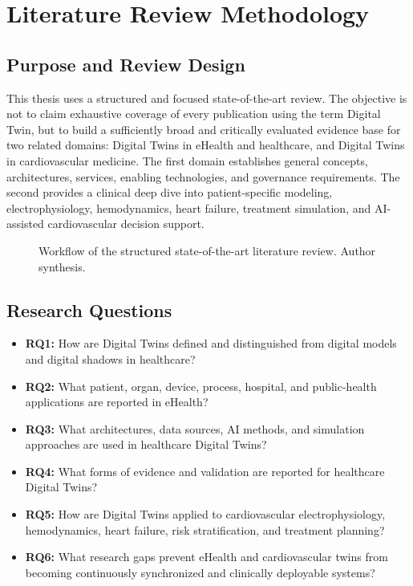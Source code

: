 \chapter{Literature Review Methodology}

\section{Purpose and Review Design}
This thesis uses a structured and focused state-of-the-art review. The objective is not to claim exhaustive coverage of every publication using the term Digital Twin, but to build a sufficiently broad and critically evaluated evidence base for two related domains: Digital Twins in eHealth and healthcare, and Digital Twins in cardiovascular medicine. The first domain establishes general concepts, architectures, services, enabling technologies, and governance requirements. The second provides a clinical deep dive into patient-specific modeling, electrophysiology, hemodynamics, heart failure, treatment simulation, and AI-assisted cardiovascular decision support.

\begin{figure}[H]
    \centering
    \resizebox{0.55\textwidth}{!}{}
    \caption{Workflow of the structured state-of-the-art literature review. Author synthesis.}
    \label{fig:review_workflow}
\end{figure}

\section{Research Questions}
\begin{itemize}[leftmargin=*]
    \item \textbf{RQ1:} How are Digital Twins defined and distinguished from digital models and digital shadows in healthcare?
    \item \textbf{RQ2:} What patient, organ, device, process, hospital, and public-health applications are reported in eHealth?
    \item \textbf{RQ3:} What architectures, data sources, AI methods, and simulation approaches are used in healthcare Digital Twins?
    \item \textbf{RQ4:} What forms of evidence and validation are reported for healthcare Digital Twins?
    \item \textbf{RQ5:} How are Digital Twins applied to cardiovascular electrophysiology, hemodynamics, heart failure, risk stratification, and treatment planning?
    \item \textbf{RQ6:} What research gaps prevent eHealth and cardiovascular twins from becoming continuously synchronized and clinically deployable systems?
\end{itemize}

